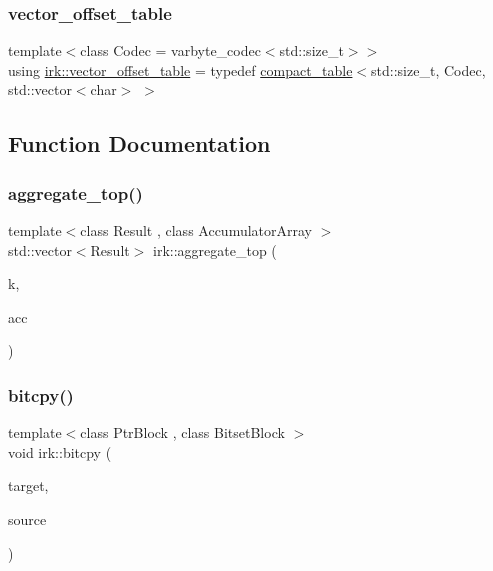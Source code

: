 \subsubsection{\texorpdfstring{vector\+\_\+offset\+\_\+table}{vector\_offset\_table}}
{\footnotesize\ttfamily template$<$class Codec  = varbyte\+\_\+codec$<$std\+::size\+\_\+t$>$$>$ \\
using \mbox{\hyperlink{namespaceirk_a6d042444ebc87e3036291ec5656b0c51}{irk\+::vector\+\_\+offset\+\_\+table}} = typedef \mbox{\hyperlink{classirk_1_1compact__table}{compact\+\_\+table}}$<$std\+::size\+\_\+t, Codec, std\+::vector$<$char$>$ $>$}



\subsection{Function Documentation}
\mbox{\label{namespaceirk_a068256b1f4dd5e0025e793d6d93b6896}} 
\subsubsection{\texorpdfstring{aggregate\+\_\+top()}{aggregate\_top()}}
{\footnotesize\ttfamily template$<$class Result , class Accumulator\+Array $>$ \\
std\+::vector$<$Result$>$ irk\+::aggregate\+\_\+top (\begin{DoxyParamCaption}\item[{std\+::size\+\_\+t}]{k,  }\item[{const Accumulator\+Array \&}]{acc }\end{DoxyParamCaption})}

\mbox{\label{namespaceirk_ae79f958d4bca4bb9e05628261f2fb725}} 
\subsubsection{\texorpdfstring{bitcpy()}{bitcpy()}\hspace{0.1cm}{\footnotesize\ttfamily [1/2]}}
{\footnotesize\ttfamily template$<$class Ptr\+Block , class Bitset\+Block $>$ \\
void irk\+::bitcpy (\begin{DoxyParamCaption}\item[{\mbox{\hyperlink{classirk_1_1bitptr}{bitptr}}$<$ Ptr\+Block $>$}]{target,  }\item[{const boost\+::dynamic\+\_\+bitset$<$ Bitset\+Block $>$ \&}]{source }\end{DoxyParamCaption})}

